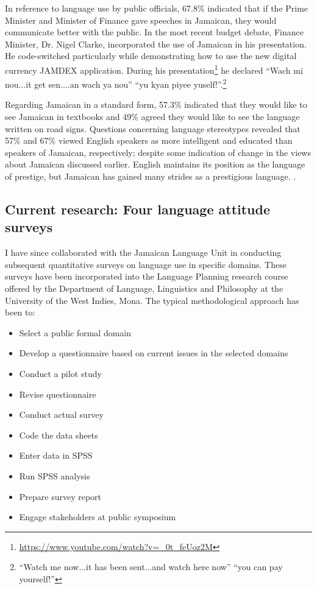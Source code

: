 \documentclass[output=paper,colorlinks,citecolor=brown]{langscibook}
\begin{document}
In reference to language use by public officials, 67.8\% indicated that if the Prime Minister and Minister of Finance gave speeches in Jamaican, they would communicate better with the public. In the most recent budget debate, Finance Minister, Dr. Nigel Clarke, incorporated the use of Jamaican in his presentation. He code-switched particularly while demonstrating how to use the new digital currency JAMDEX application. During his presentation\footnote{\url{https://www.youtube.com/watch?v=_0t_feUoz2M}} he declared “Wach mi nou...it get sen....an wach ya nou” “yu kyan piyee yuself!”.\footnote{“Watch me now...it has been sent...and watch here now” “you can pay yourself!”}

Regarding Jamaican in a standard form, 57.3\% indicated that they would like to see Jamaican in textbooks and 49\% agreed they would like to see the language written on road signs. Questions concerning language stereotypes revealed that 57\% and 67\% viewed English speakers as more intelligent and educated than speakers of Jamaican, respectively; despite some indication of change in the views about Jamaican discussed earlier. English maintains its position as the language of prestige, but Jamaican has gained many strides as a prestigious language. \citep{DevonishWalters2015}.

\subsection{Current research: Four language attitude surveys}

I have since collaborated with the Jamaican Language Unit in conducting subsequent quantitative surveys on language use in specific domains. These surveys have been incorporated into the Language Planning research course offered by the Department of Language, Linguistics and Philosophy at the University of the West Indies, Mona. The typical methodological approach has been to:

\begin{itemize}
    \item Select a public formal domain
    \item Develop a questionnaire based on current issues in the selected domains
    \item Conduct a pilot study
    \item Revise questionnaire
    \item Conduct actual survey
    \item Code the data sheets
    \item Enter data in SPSS
    \item Run SPSS analysis
    \item Prepare survey report
    \item Engage stakeholders at public symposium
\end{itemize}
\end{document}
